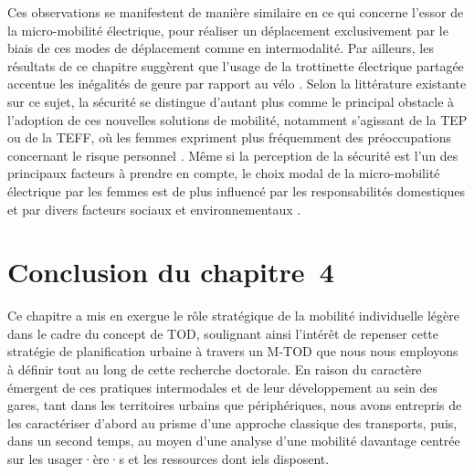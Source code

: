 \begin{refsegment}
Ces observations se manifestent de manière similaire en ce qui concerne l'essor de la micro-mobilité électrique, pour réaliser un déplacement exclusivement par le biais de ces modes de déplacement comme en intermodalité. Par ailleurs, les résultats de ce chapitre suggèrent que l'usage de la trottinette électrique partagée accentue les inégalités de genre par rapport au vélo \textcolor{blue}{\autocite[7]{younes_gender_2023}}. Selon la littérature existante sur ce sujet, la sécurité se distingue d'autant plus comme le principal obstacle à l'adoption de ces nouvelles solutions de mobilité, notamment s'agissant de la \acrshort{TEP} ou de la \acrshort{TEFF}, où les femmes expriment plus fréquemment des préoccupations concernant le risque personnel \textcolor{blue}{\autocite[10]{parnell_gender_2023}}. Même si la perception de la sécurité est l'un des principaux facteurs à prendre en compte, le choix modal de la micro-mobilité électrique par les femmes est de plus influencé par les responsabilités domestiques et par divers facteurs sociaux et environnementaux \textcolor{blue}{\autocite[22]{emond_explaining_2009}}.%

    \newpage
\section*{Conclusion du chapitre~4
    \label{chap4:conclusion}
    }

Ce chapitre a mis en exergue le rôle stratégique de la mobilité individuelle légère dans le cadre du concept de \acrshort{TOD}, soulignant ainsi l'intérêt de repenser cette stratégie de planification urbaine à travers un \acrshort{M-TOD} que nous nous employons à définir tout au long de cette recherche doctorale. En raison du caractère émergent de ces pratiques intermodales et de leur développement au sein des gares, tant dans les territoires urbains que périphériques, nous avons entrepris de les caractériser d'abord au prisme d'une approche classique des transports, puis, dans un second temps, au moyen d'une analyse d'une mobilité davantage centrée sur les usager·ère·s et les ressources dont iels disposent.%


\end{refsegment}
